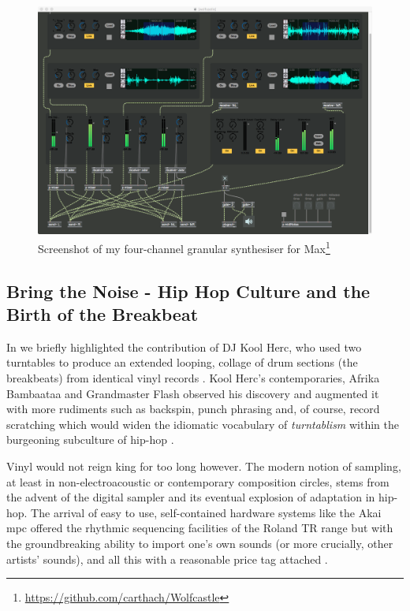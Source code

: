 \begin{figure}
	\begin{center}
		\includegraphics[width=1.0\textwidth]{ch04_sota/figures/wolfecastle.png}
	\end{center}
	\caption[Screenshot of my four-channel granular synthesiser for Max]{Screenshot of my four-channel granular synthesiser for Max\footnote{\url{https://github.com/carthach/Wolfcastle}}}
	\label{fig:wolfcastle}
\end{figure}

\subsection{Bring the Noise - Hip Hop Culture and the Birth of the Breakbeat}

In  we briefly highlighted the contribution of DJ Kool Herc, who used two turntables to produce an extended looping, collage of drum sections (the breakbeats) from identical vinyl records \citep{Forman2004}. Kool Herc's contemporaries, Afrika Bambaataa and Grandmaster Flash observed his discovery and augmented it with more rudiments such as backspin, punch phrasing and, of course, record scratching which would widen the idiomatic vocabulary of \textit{turntablism} within the burgeoning subculture of hip-hop \citep{Smith2000}.

Vinyl would not reign king for too long however. The modern notion of sampling, at least in non-electroacoustic or contemporary composition circles, stems from the advent of the digital sampler and its eventual explosion of adaptation in hip-hop. The arrival of easy to use, self-contained hardware systems like the Akai \acrfull{mpc} offered the rhythmic sequencing facilities of the Roland TR range but with the groundbreaking ability to import one's own sounds (or more crucially, other artists' sounds), and all this with a reasonable price tag attached \citep{Rodgers2003}.

